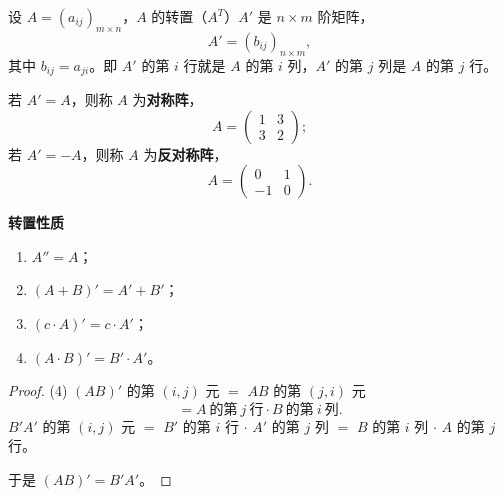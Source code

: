 \begin{definition}%
设 $A=(a_{ij})_{m\times n}$，$A$ 的转置（$A^{T}$）$A'$ 是 $n\times m$ 阶矩阵，
\[
A'=(b_{ij})_{n\times m},
\]
其中 $b_{ij}=a_{ji}$。即 $A'$ 的第 $i$ 行就是 $A$ 的第 $i$ 列，$A'$ 的第 $j$ 列是 $A$ 的第 $j$ 行。

若 $A'=A$，则称 $A$ 为\textbf{对称阵}，
\[
A=\begin{pmatrix}1 & 3\\3 & 2\end{pmatrix};
\]
若 $A'=-A$，则称 $A$ 为\textbf{反对称阵}，
\[
A=\begin{pmatrix}0 & 1\\-1 & 0\end{pmatrix}.
\]
\end{definition}

\textbf{转置性质}
\begin{enumerate}[label=(\arabic*)]
\item $A''=A$；
\item $(A+B)'=A'+B'$；
\item $(c\cdot A)'=c\cdot A'$；
\item $(A\cdot B)'=B'\cdot A'$。
\end{enumerate}

\begin{proof}
(4) $(AB)'$ 的第 $(i,j)$ 元 $=$ $AB$ 的第 $(j,i)$ 元
\[
=A\ \text{的第}\ j\ \text{行}\cdot B\ \text{的第}\ i\ \text{列}.
\]
$B'A'$ 的第 $(i,j)$ 元 $=$ $B'$ 的第 $i$ 行 $\cdot$ $A'$ 的第 $j$ 列 $=$ $B$ 的第 $i$ 列 $\cdot$ $A$ 的第 $j$ 行。

于是 $(AB)'=B'A'$。
\end{proof}
